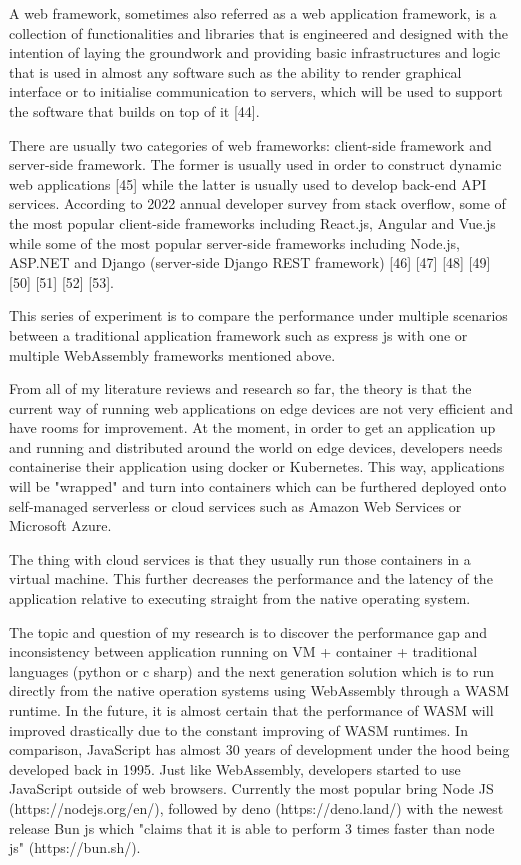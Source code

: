 \bigskip

A web framework, sometimes also referred as a web application framework, is a collection of functionalities and libraries that is engineered and designed with the intention of laying the groundwork and providing basic infrastructures and logic that is used in almost any software such as the ability to render graphical interface or to initialise communication to servers, which will be used to support the software that builds on top of it [44].

There are usually two categories of web frameworks: client-side framework and server-side framework. The former is usually used in order to construct dynamic web applications [45] while the latter is usually used to develop back-end API services. According to 2022 annual developer survey from stack overflow, some of the most popular client-side frameworks including React.js, Angular and Vue.js while some of the most popular server-side frameworks including Node.js, ASP.NET and Django (server-side Django REST framework) [46] [47] [48] [49] [50] [51] [52] [53].

\bigskip
\bigskip
\bigskip
\bigskip
\bigskip



This series of experiment is to compare the performance under multiple scenarios between a traditional application framework such as express js with one or multiple WebAssembly frameworks mentioned above.

From all of my literature reviews and research so far, the theory is that the current way of running web applications on edge devices are not very efficient and have rooms for improvement. At the moment, in order to get an application up and running and distributed around the world on edge devices, developers needs containerise their application using docker or Kubernetes. This way, applications will be "wrapped" and turn into containers which can be furthered deployed onto self-managed serverless or cloud services such as Amazon Web Services or Microsoft Azure.

The thing with cloud services is that they usually run those containers in a virtual machine. This further decreases the performance and the latency of the application relative to executing straight from the native operating system.

The topic and question of my research is to discover the performance gap and inconsistency between application running on VM + container + traditional languages (python or c sharp) and the next generation solution which is to run directly from the native operation systems using WebAssembly through a WASM runtime. In the future, it is almost certain that the performance of WASM will improved drastically due to the constant improving of WASM runtimes. In comparison, JavaScript has almost 30 years of development under the hood being developed back in 1995. Just like WebAssembly, developers started to use JavaScript outside of web browsers. Currently the most popular bring Node JS (https://nodejs.org/en/), followed by deno (https://deno.land/) with the newest release Bun js which "claims that it is able to perform 3 times faster than node js" (https://bun.sh/).

